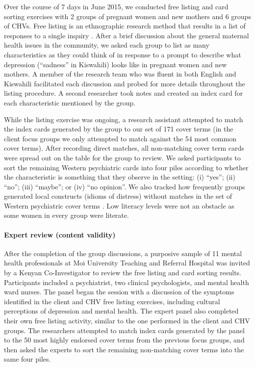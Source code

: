 \documentclass[man,natbib,longtable]{apa6}\usepackage[]{graphicx}\usepackage[]{color}
\begin{document}
Over the course of 7 days in June 2015, we conducted free listing and card sorting exercises with 2 groups of pregnant women and new mothers and 6 groups of CHVs. Free listing is an ethnographic research method that results in a list of responses to a single inquiry \citep{Bolton:2001}. After a brief discussion about the general maternal health issues in the community, we asked each group to list as many characteristics as they could think of in response to a prompt to describe what depression (``sadness'' in Kiswahili) looks like in pregnant women and new mothers. A member of the research team who was fluent in both English and Kiswahili facilitated each discussion and probed for more details throughout the listing procedure. A second researcher took notes and created an index card for each characteristic mentioned by the group.

While the listing exercise was ongoing, a research assistant attempted to match the index cards generated by the group to our set of 171 cover terms (in the client focus groups we only attempted to match against the 54 most common cover terms). After recording direct matches, all non-matching cover term cards were spread out on the table for the group to review. We asked participants to sort the remaining Western psychiatric cards into four piles according to whether the characteristic is something that they observe in the setting: (i) ``yes''; (ii) ``no''; (iii) ``maybe''; or (iv) ``no opinion''. We also tracked how frequently groups generated local constructs (idioms of distress) without matches in the set of Western psychiatric cover terms \citep{Kohrt:2011}. Low literacy levels were not an obstacle as some women in every group were literate.

\paragraph{Expert review (content validity)}

After the completion of the group discussions, a purposive sample of 11 mental health professionals at Moi University Teaching and Referral Hospital was invited by a Kenyan Co-Investigator to review the free listing and card sorting results. Participants included a psychiatrist, two clinical psychologists, and mental health ward nurses. The panel began the session with a discussion of the symptoms identified in the client and CHV free listing exercises, including cultural perceptions of depression and mental health. The expert panel also completed their own free listing activity, similar to the one performed in the client and CHV groups. The researchers attempted to match index cards generated by the panel to the 50 most highly endorsed cover terms from the previous focus groups, and then asked the experts to sort the remaining non-matching cover terms into the same four piles.
\end{document}
